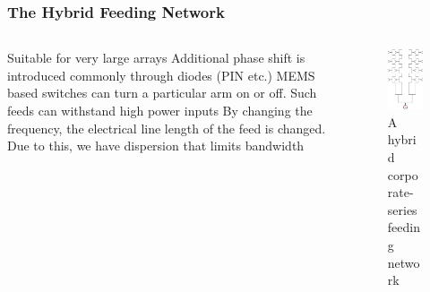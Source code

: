 \documentclass[10pt]{beamer}
\begin{document}
\begin{frame}
    \frametitle{The Hybrid Feeding Network}
    \begin{columns}[] %
        \begin{column}{.5\textwidth}
            \begin{outline}
                \1 Suitable for very large arrays
                \2 Additional phase shift is introduced commonly through diodes (PIN etc.)
                \1 MEMS based switches can turn a particular arm on or off.
                \2 Such feeds can withstand high power inputs
                \1 By changing the frequency, the electrical line length of the feed is changed.
                \2 Due to this, we have dispersion that limits bandwidth
            \end{outline}   
        \end{column}
        \begin{column}{.5\textwidth}
            \begin{figure}[h!]
                \centering
                \includegraphics[width=.6\textwidth]{hybrid.pdf}
                \caption{A hybrid corporate-series feeding network}
            \end{figure}
        \end{column}%
    \end{columns}
\end{frame}
\end{document}
